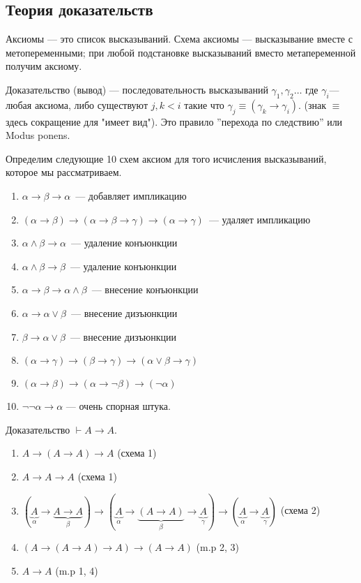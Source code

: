 \subsection{Теория доказательств}
\begin{definition}
    Аксиомы --- это список высказываний.
    Схема аксиомы --- высказывание вместе с метопеременными; при любой подстановке высказываний вместо метапеременной получим аксиому.
\end{definition}

\begin{definition}
    Доказательство (вывод) --- последовательность высказываний $\gamma_1, \gamma_2\ldots$ где $\gamma_i$--- любая аксиома,
    либо существуют $j,k < i$ такие что $\gamma_j \equiv (\gamma_k \to \gamma_i)$.
    (знак $\equiv$ здесь сокращение для "имеет вид"). Это правило ''перехода по следствию'' или Modus ponens.
\end{definition}

Определим следующие 10 схем аксиом для того исчисления высказываний, которое мы рассматриваем.
\begin{enumerate}
    \item $\alpha \to \beta \to \alpha$~--- добавляет импликацию
    \item $(\alpha \to \beta) \to (\alpha \to \beta \to \gamma) \to (\alpha \to \gamma)$~--- удаляет импликацию
    \item $\alpha \land \beta \to \alpha$~--- удаление конъюнкции
    \item $\alpha \land \beta \to \beta$~--- удаление конъюнкции
    \item $\alpha \to \beta \to \alpha \land \beta$~--- внесение конъюнкции
    \item $\alpha \to \alpha \lor \beta$~--- внесение дизъюнкции
    \item $\beta \to \alpha \lor \beta$~--- внесение дизъюнкции
    \item $(\alpha \to \gamma) \to (\beta \to \gamma) \to (\alpha \lor \beta \to \gamma)$
    \item $(\alpha \to \beta) \to (\alpha \to \neg \beta) \to (\neg \alpha)$
    \item $\neg \neg \alpha \to \alpha$ --- очень спорная штука.
\end{enumerate}

\begin{example} Доказательство
    $\vdash A \to A $.
    \begin{enumerate}
        \item $A \to (A \to A) \to A$ (схема 1)
        \item $A \to A \to A$  (схема 1)
        \item $(\underbrace{A}_\alpha \to \underbrace{A \to A}_\beta) \to (\underbrace{A}_\alpha \to \underbrace{(A \to A)}_\beta \to \underbrace{A}_\gamma) \to (\underbrace{A}_\alpha \to \underbrace{A}_\gamma)$  (схема 2)
        \item $(A \to (A \to A) \to A) \to (A \to A)$ (m.p 2, 3)
        \item $A \to A$ (m.p 1, 4)
    \end{enumerate}
\end{example}